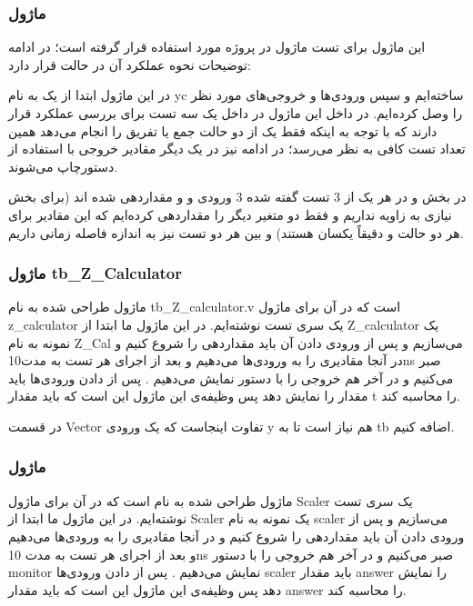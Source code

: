 \documentclass[12pt,titlepage,a4page , tikz , multi,table , svgnames,xcdraw]{article}
\begin{document}
\subsubsection{ماژول }



این ماژول برای تست ماژول در پروژه مورد استفاده قرار گرفته است؛ در ادامه توضیحات نحوه عملکرد آن در حالت  قرار دارد:


در این ماژول ابتدا از  یک  به نام yc ساخته‌ایم و سپس ورودی‌ها و خروجی‌های مورد نظر را وصل کرده‌ایم. در داخل این ماژول در داخل یک  سه تست برای بررسی عملکرد  قرار دارند که با توجه به اینکه فقط یک از دو حالت جمع یا تفریق را انجام می‌دهد همین تعداد تست کافی به نظر می‌رسد؛ در ادامه نیز در یک  دیگر مقادیر خروجی  با استفاده از دستورچاپ می‌شوند.


در بخش  و در هر یک از 3 تست گفته شده 3 ورودی  و  و  مقداردهی شده اند (برای بخش  نیازی به زاویه نداریم و فقط دو متغیر دیگر را مقداردهی کرده‌ایم که این مقادیر برای هر دو حالت  و  دقیقاً یکسان هستند) و بین هر دو تست نیز به اندازه  فاصله زمانی داریم.


\subsubsection{ماژول tb\_Z\_Calculator}

ماژول طراحی شده  به نام tb\_Z\_calculator.v   است که در آن برای ماژول z\_calculator  یک سری تست نوشته‌ایم. در این ماژول ما ابتدا از Z\_calculator  یک نمونه به نام Z\_Cal  می‌سازیم و پس از ورودی دادن آن باید مقداردهی را شروع کنیم و در آنجا مقادیری را به ورودی‌ها می‌دهیم و بعد از اجرای هر تست به مدت10ns  صبر می‌کنیم و در آخر هم خروجی را با  دستور   نمایش می‌دهیم . پس از  دادن ورودی‌ها   باید مقدار   را نمایش دهد پس وظیفه‌ی این ماژول این است که باید مقدار t  را محاسبه کند.

در قسمت Vector تفاوت اینجاست که یک ورودی y هم نیاز است تا به tb اضافه کنیم.

\subsubsection{ماژول }


ماژول طراحی شده  به نام    است که در آن برای ماژول Scaler یک سری تست نوشته‌ایم. در این ماژول ما ابتدا از Scaler یک نمونه به نام scaler می‌سازیم و پس از ورودی دادن آن باید مقداردهی را شروع کنیم و در آنجا مقادیری را به ورودی‌ها می‌دهیم و بعد از اجرای هر تست به مدت 10ns  صبر می‌کنیم و در آخر هم خروجی را با  دستور monitor  نمایش می‌دهیم . پس از  دادن ورودی‌ها scaler باید مقدار answer را نمایش دهد پس وظیفه‌ی این ماژول این است که باید مقدار answer را محاسبه کند.
\end{document}
